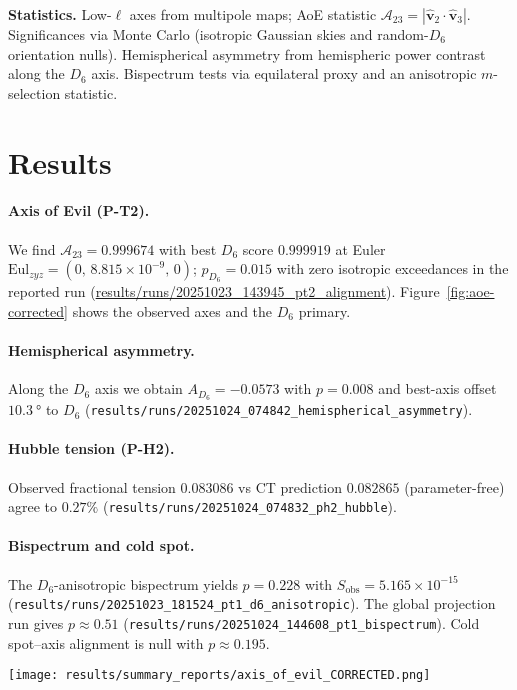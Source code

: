 \documentclass[reprint,aps,prl,twocolumn,nofootinbib,longbibliography]{revtex4-2}
\DeclareRobustCommand{\Eul}{\mathrm{Eul}}
\begin{document}
\textbf{Statistics.} Low-$\ell$ axes from multipole maps; AoE statistic $\mathcal{A}_{23}=|\hat{\bm v}_2\cdot\hat{\bm v}_3|$. Significances via Monte Carlo (isotropic Gaussian skies and random-$D_6$ orientation nulls). Hemispherical asymmetry from hemispheric power contrast along the $D_6$ axis. Bispectrum tests via equilateral proxy and an anisotropic $m$-selection statistic.

\section{Results}
\paragraph{Axis of Evil (P-T2).} We find $\mathcal{A}_{23}=0.999674$ with best $D_6$ score $0.999919$ at Euler $\Eul_{zyz}=(0,\,8.815\times10^{-9},\,0)$; $p_{D_6}=0.015$ with zero isotropic exceedances in the reported run (\url{results/runs/20251023_143945_pt2_alignment}). Figure~\ref{fig:aoe-corrected} shows the observed axes and the $D_6$ primary.

\paragraph{Hemispherical asymmetry.} Along the $D_6$ axis we obtain $A_{D_6}=-0.0573$ with $p=0.008$ and best-axis offset $\SI{10.3}{\degree}$ to $D_6$ (\texttt{results/runs/20251024\_074842\_hemispherical\_asymmetry}).

\paragraph{Hubble tension (P-H2).} Observed fractional tension $0.083086$ vs CT prediction $0.082865$ (parameter-free) agree to $0.27\%$ (\texttt{results/runs/20251024\_074832\_ph2\_hubble}).

\paragraph{Bispectrum and cold spot.} The $D_6$-anisotropic bispectrum yields $p=0.228$ with $S_{\mathrm{obs}}=5.165\times 10^{-15}$ (\texttt{results/runs/20251023\_181524\_pt1\_d6\_anisotropic}). The global projection run gives $p\approx 0.51$ (\texttt{results/runs/20251024\_144608\_pt1\_bispectrum}). Cold spot–axis alignment is null with $p\approx 0.195$.

\begin{figure*}[t]
  \centering
  \texttt{[image: results/summary\_reports/axis\_of\_evil\_CORRECTED.png]}
  \caption{Axis of Evil — corrected visualization from the PT2 run (\url{results/runs/20251023_143945_pt2_alignment}). Panels: 3D axes, sky positions, and summary.}
  \label{fig:aoe-corrected}
\end{figure*}
\end{document}
